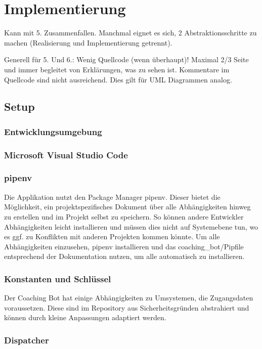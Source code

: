 \chapter{Implementierung}

Kann mit 5. Zusammenfallen. Manchmal eignet es sich, 2 Abstraktionsschritte zu machen (Realisierung und Implementierung getrennt).  
  
Generell für 5. Und 6.: Wenig Quellcode (wenn überhaupt)! Maximal 2/3 Seite und immer begleitet von Erklärungen, was zu sehen ist. Kommentare im Quellcode sind nicht ausreichend. Dies gilt für UML Diagrammen analog.  


\section{Setup}
\subsection{Entwicklungsumgebung}

\subsection{Microsoft Visual Studio Code}

\subsection{pipenv}
Die Applikation nutzt den Package Manager pipenv. Dieser bietet die Möglichkeit, ein projektspezifisches Dokument über alle Abhängigkeiten hinweg zu erstellen und im Projekt selbst zu speichern. So können andere Entwickler Abhängigkeiten leicht installieren und müssen dies nicht auf Systemebene tun, wo es ggf. zu Konflikten mit anderen Projekten kommen könnte. 
Um alle Abhängigkeiten einzusehen, pipenv \cite{pipenv} installieren und das coaching_bot/Pipfile entsprechend der Dokumentation nutzen, um alle automatisch zu installieren.

\subsection{Konstanten und Schlüssel}

Der Coaching Bot hat einige Abhängigkeiten zu Umsystemen, die Zugangsdaten voraussetzen. Diese sind im Repository \cite{repo} aus Sicherheitsgründen abstrahiert und können durch kleine Anpassungen adaptiert werden. 


\subsection{Dispatcher}

